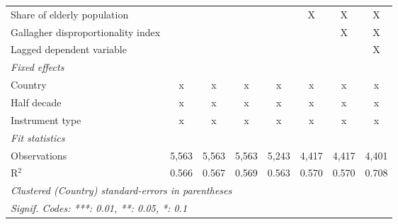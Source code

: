 \begin{tabular}{lccccccc}
   Share of elderly population                                                           &               &         &               &         & X       & X       & X\\  
   Gallagher disproportionality index                                                    &               &         &               &         &         & X       & X\\  
   Lagged dependent variable                                                             &               &         &               &         &         &         & X\\  
   \emph{Fixed effects}\\
   Country                                                                               & x             & x       & x             & x       & x       & x       & x\\  
   Half decade                                                                           & x             & x       & x             & x       & x       & x       & x\\  
   Instrument type                                                                       & x             & x       & x             & x       & x       & x       & x\\  
   \midrule \emph{Fit statistics}\\
   Observations                                                                          & 5,563         & 5,563   & 5,563         & 5,243   & 4,417   & 4,417   & 4,401\\  
   R$^2$                                                                                 & 0.566         & 0.567   & 0.569         & 0.563   & 0.570   & 0.570   & 0.708\\  
   \midrule
   \multicolumn{8}{l}{\emph{Clustered (Country) standard-errors in parentheses}}\\
   \multicolumn{8}{l}{\emph{Signif. Codes: ***: 0.01, **: 0.05, *: 0.1}}\\
\end{tabular}
\par\endgroup


